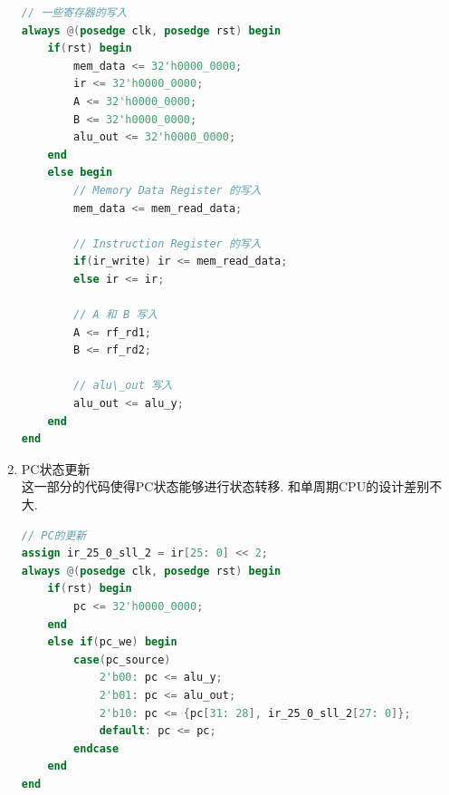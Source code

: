 \documentclass[UTF8]{article}
\begin{document}
\begin{enumerate}
\begin{lstlisting}[language=verilog]
// 一些寄存器的写入
always @(posedge clk, posedge rst) begin
    if(rst) begin
        mem_data <= 32'h0000_0000;
        ir <= 32'h0000_0000;
        A <= 32'h0000_0000;
        B <= 32'h0000_0000;
        alu_out <= 32'h0000_0000;
    end
    else begin
        // Memory Data Register 的写入
        mem_data <= mem_read_data;
        
        // Instruction Register 的写入
        if(ir_write) ir <= mem_read_data;
        else ir <= ir;
        
        // A 和 B 写入
        A <= rf_rd1;
        B <= rf_rd2;
        
        // alu\_out 写入
        alu_out <= alu_y;
    end
end
	\end{lstlisting}
	
	\item PC状态更新\\
	这一部分的代码使得PC状态能够进行状态转移. 和单周期CPU的设计差别不大.
	\begin{lstlisting}[language=verilog]
// PC的更新
assign ir_25_0_sll_2 = ir[25: 0] << 2;
always @(posedge clk, posedge rst) begin
    if(rst) begin
        pc <= 32'h0000_0000;
    end
    else if(pc_we) begin
        case(pc_source)
            2'b00: pc <= alu_y;
            2'b01: pc <= alu_out;
            2'b10: pc <= {pc[31: 28], ir_25_0_sll_2[27: 0]};
            default: pc <= pc;
        endcase
    end
end
	\end{lstlisting}
	

\end{enumerate}
\end{document}

